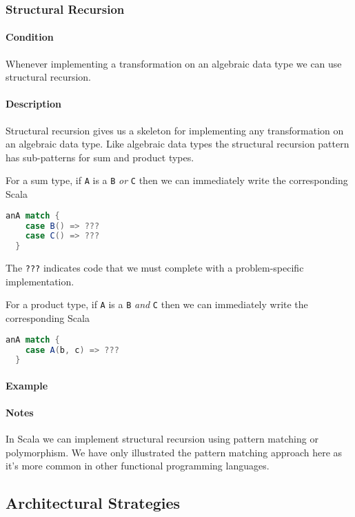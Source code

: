 \subsubsection{Structural Recursion}
\paragraph{Condition} Whenever implementing a transformation on an algebraic data type we can use structural recursion.

\paragraph{Description} Structural recursion gives us a skeleton for implementing any transformation on an algebraic data type. Like algebraic data types the structural recursion pattern has sub-patterns for sum and product types.

For a sum type, if \texttt{A} is a \texttt{B} \emph{or} \texttt{C} then we can immediately write the corresponding Scala

\begin{lstlisting}[language=scala]
  anA match {
    case B() => ???
    case C() => ???
  }
\end{lstlisting}

The \texttt{???} indicates code that we must complete with a problem-specific implementation.

For a product type, if \texttt{A} is a \texttt{B} \emph{and} \texttt{C} then we can immediately write the corresponding Scala

\begin{lstlisting}[language=scala]
  anA match {
    case A(b, c) => ???
  }
\end{lstlisting}


\paragraph{Example}

\paragraph{Notes} In Scala we can implement structural recursion using pattern matching or polymorphism. We have only illustrated the pattern matching approach here as it's more common in other functional programming languages.



\subsection{Architectural Strategies}

